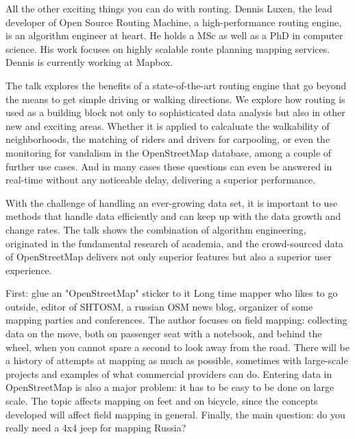 %
{All the other exciting things you can do with routing.}%
{Dennis Luxen, the lead developer of Open Source Routing Machine, a high-performance routing engine, is an algorithm engineer at heart. He holds a MSc as well as a PhD in computer science. His work focuses on highly scalable route planning mapping services. Dennis is currently working at Mapbox. }%
{The talk explores the benefits of a state-of-the-art routing engine that go beyond the means to get simple driving or walking directions. We explore how 
routing is used as a building block not only to sophisticated data analysis but also in other new and exciting areas. Whether it is applied to calcaluate the walkability of neighborhoods, the matching of riders and drivers for carpooling, or even the monitoring for vandalism in the OpenStreetMap database, 
among a couple of further use cases. And in many cases these questions can even be answered in real-time without any noticeable delay, delivering a superior performance.

With the challenge of handling an ever-growing data set, it is important to use methods that handle data efficiently and can keep up with the data growth and change rates. The talk shows the combination of algorithm engineering, originated in the fundamental research of academia, and the crowd-sourced data 
of OpenStreetMap delivers not only superior features but also a superior user experience.}

%
{First: glue an "OpenStreetMap" sticker to it}%
{Long time mapper who likes to go outside, editor of SHTOSM, a russian OSM news blog, organizer of some mapping parties and conferences. }%
{The author focuses on field mapping: collecting data on the move, both on passenger seat with a notebook, and behind the wheel, when you cannot spare a second to look away from the road. There will be a history of attempts at mapping as much as possible, sometimes with large-scale projects and examples of what commercial providers can do. Entering data in OpenStreetMap is also a major problem: it has to be easy to be done on large scale. The topic affects mapping on feet and on bicycle, since the concepts developed will affect field mapping in general. Finally, the main question: do you really need a 4x4 jeep for mapping Russia?}

